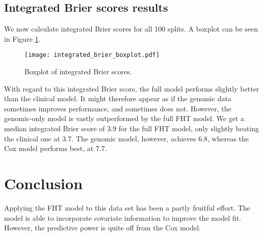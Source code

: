 

\subsection{Integrated Brier scores results}
We now calculate integrated Brier scores for all 100 splits.
A boxplot can be seen in Figure \ref{fig:neuroblastoma-integrated-brier}.
\begin{figure}
\caption{Boxplot of integrated Brier scores.}
\label{fig:neuroblastoma-integrated-brier}
\centering
\texttt{[image: integrated\_brier\_boxplot.pdf]}
\end{figure}
With regard to this integrated Brier score, the full model performs slightly better than the clinical model.
It might therefore appear as if the genomic data sometimes improves performance, and sometimes does not.
However, the genomic-only model is vastly outperformed by the full FHT model.
We get a median integrated Brier score of 3.9 for the full FHT model, only slightly beating the clinical one at 3.7.
The genomic model, however, achieves 6.8, whereas the Cox model performs best, at 7.7.

\section{Conclusion}
Applying the FHT model to this data set has been a partly fruitful effort.
The model is able to incorporate covariate information to improve the model fit.
However, the predictive power is quite off from the Cox model.






